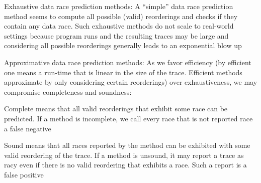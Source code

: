 \documentclass[landscape, a4paper]{article}
\begin{document}
\begin{minipage}[t]{0.2\linewidth}
\begin{betterlist}
		\begin{betterlist}
			\item \alert{Exhaustive data race prediction methods:} A \enquote{simple} data race prediction method seems to compute all possible (valid) reorderings and checks if they contain any data race. Such exhaustive methods do not scale to real-world settings because program runs and the resulting traces may be large and considering all possible reorderings generally leads to an \alert{exponential blow up}
			\item \alert{Approximative data race prediction methods:} As we favor efficiency (by efficient one means a run-time that is \alert{linear} in the size of the trace. \alert{Efficient methods} approximate by only considering certain reorderings) over exhaustiveness, we may compromise \alert{completeness} and \alert{soundness}:
			\begin{betterlist}
				\item \alert{Complete} means that all valid reorderings that exhibit some race can be predicted. If a method is \alert{incomplete}, we call every race that is not reported race a \alert{false negative}
				\item \alert{Sound} means that all races reported by the method can be exhibited with some valid reordering of the trace. If a method is \alert{unsound}, it may report a trace as racy even if there is no valid reordering that exhibits a race. Such a report is a \alert{false positive}
			\end{betterlist}
		\end{betterlist}
	\end{betterlist}
\end{minipage}
\end{document}
